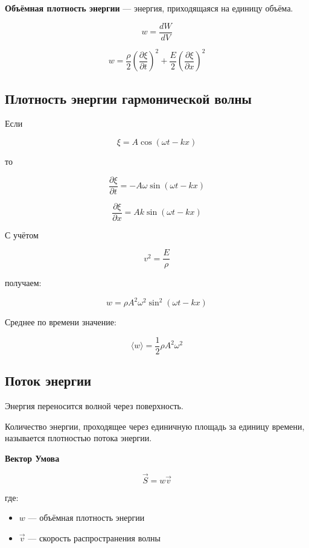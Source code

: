 \documentclass[a4paper,12pt]{article}
\begin{document}
\begin{definitionbox}
\textbf{Объёмная плотность энергии} — энергия, приходящаяся на единицу объёма.
\end{definitionbox}

\[
w = \frac{dW}{dV}
\]

\[
w =
\frac{\rho}{2}
\left(
\frac{\partial \xi}{\partial t}
\right)^2
+
\frac{E}{2}
\left(
\frac{\partial \xi}{\partial x}
\right)^2
\]

\subsection*{Плотность энергии гармонической волны}

Если

\[
\xi = A \cos(\omega t - kx)
\]

то

\[
\frac{\partial \xi}{\partial t}
=
- A \omega \sin(\omega t - kx)
\]

\[
\frac{\partial \xi}{\partial x}
=
A k \sin(\omega t - kx)
\]

С учётом

\[
v^2 = \frac{E}{\rho}
\]

получаем:

\[
w =
\rho A^2 \omega^2 \sin^2(\omega t - kx)
\]

Среднее по времени значение:

\[
\langle w \rangle =
\frac{1}{2}
\rho A^2 \omega^2
\]

\subsection*{Поток энергии}

Энергия переносится волной через поверхность.

Количество энергии, проходящее через единичную площадь за единицу времени, называется плотностью потока энергии.

\begin{definitionbox}
\textbf{Вектор Умова}


\[
\vec S = w \vec v
\]

где:

\begin{itemize}
\item \(w\) — объёмная плотность энергии
\item \(\vec v\) — скорость распространения волны
\end{itemize}
\end{definitionbox}
\end{document}
